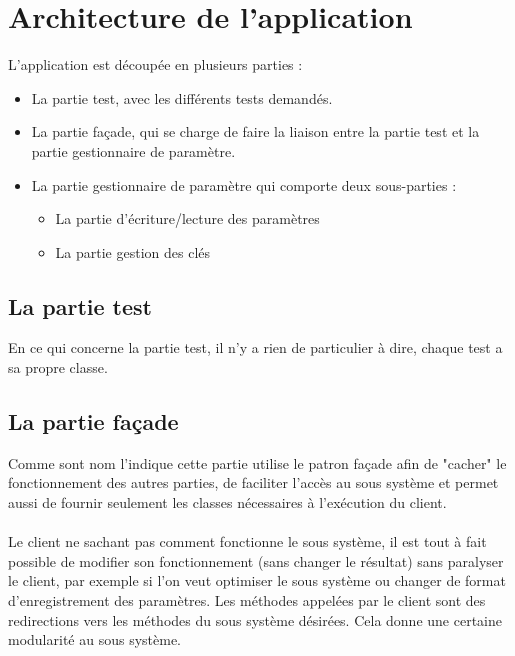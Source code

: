 \documentclass[12pt]{article}
\begin{document}
\newpage
\tableofcontents
\newpage

\section{Architecture de l'application}
\label{sec:arch_app}

	L'application est découpée en plusieurs parties : 
	\begin{itemize}
		\item La partie test, avec les différents tests demandés.
		\item La partie façade, qui se charge de faire la liaison entre la partie test et la partie gestionnaire de paramètre.
		\item La partie gestionnaire de paramètre qui comporte deux sous-parties :
		\begin{itemize}
			\item La partie d'écriture/lecture des paramètres
			\item La partie gestion des clés
		\end{itemize}
	\end{itemize}
	\subsection{La partie test}
	
	En ce qui concerne la partie test, il n'y a rien de particulier à dire, chaque test a sa propre classe.
	
	\subsection{La partie façade}

	Comme sont nom l'indique cette partie utilise le patron façade afin de "cacher" le fonctionnement des autres parties, de faciliter l'accès au sous système et permet aussi de fournir seulement les classes nécessaires à l'exécution du client.
	
	\paragraph{}
	Le client ne sachant pas comment fonctionne le sous système, il est tout à fait possible de modifier son fonctionnement (sans changer le résultat) sans paralyser le client, par exemple si l'on veut optimiser le sous système ou changer de format d'enregistrement des paramètres. Les méthodes appelées par le client sont des redirections vers les méthodes du sous système désirées. Cela donne une certaine modularité au sous système.
	
\end{document}
